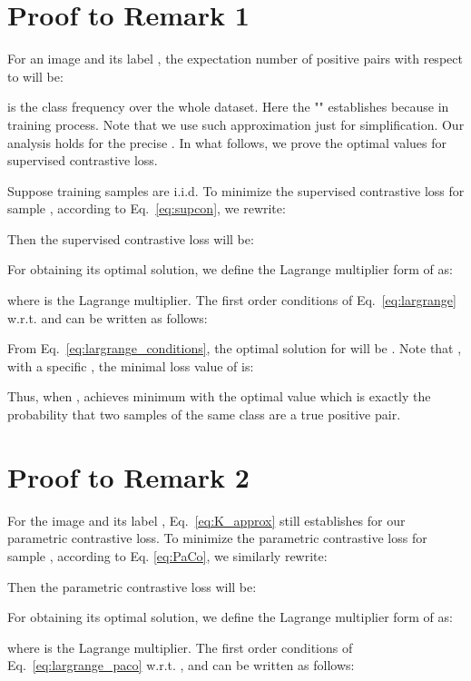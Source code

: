 \documentclass[10pt,twocolumn,letterpaper]{article}
\begin{document}
\section{Proof to Remark 1}
For an image  and its label , the expectation number of positive pairs with respect to  will be: 



 is the class frequency over the whole dataset. Here the "" establishes because  in training process. Note that we use such approximation just for simplification. Our analysis holds for the precise . In what follows, we prove the optimal values for supervised contrastive loss.

Suppose training samples are i.i.d.
To minimize the supervised contrastive loss for sample , according to Eq.~\eqref{eq:supcon}, we rewrite:


Then the supervised contrastive loss will be:


For obtaining its optimal solution, we define the Lagrange multiplier form of  as:



where  is the Lagrange multiplier. The first order conditions of Eq.~\eqref{eq:largrange} w.r.t.  and  can be written as follows:


From Eq.~\eqref{eq:largrange_conditions}, the optimal solution for  will be . Note that ,  with a specific , the minimal loss value of  is:


Thus, when ,  achieves minimum with the optimal value  which is exactly the probability that two samples of the same class are a true positive pair.


\newpage        
\section{Proof to Remark 2}
For the image  and its label ,  Eq.~\eqref{eq:K_approx} still establishes for our parametric contrastive loss. To minimize the parametric contrastive loss for sample , according to Eq. \eqref{eq:PaCo}, we similarly rewrite:



Then the parametric contrastive loss will be:



For obtaining its optimal solution, we define the Lagrange multiplier form of  as:



where  is the Lagrange multiplier. The first order conditions of Eq.~\eqref{eq:largrange_paco} w.r.t. ,  and  can be written as follows:
\end{document}

